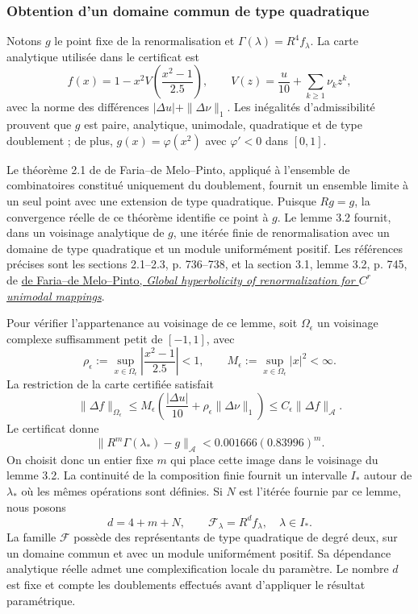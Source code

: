 \subsubsection{Obtention d’un domaine commun de type quadratique}
\label{hmtfg:clasificacion:8.1}

Notons \(g\) le point fixe de la renormalisation et
\(\Gamma(\lambda)=R^4f_\lambda\). La carte analytique utilisée dans le certificat est
\[
f(x)=1-x^2V\!\left(\frac{x^2-1}{2.5}\right),\qquad
V(z)=\frac{u}{10}+\sum_{k\ge1}\nu_kz^k,
\]
avec la norme des différences \(|\Delta u|+\|\Delta\nu\|_1\). Les inégalités d’admissibilité prouvent que \(g\) est paire, analytique, unimodale, quadratique et de type doublement ; de plus, \(g(x)=\varphi(x^2)\) avec \(\varphi'<0\) dans \([0,1]\).

Le théorème 2.1 de de Faria–de Melo–Pinto, appliqué à l’ensemble de combinatoires constitué uniquement du doublement, fournit un ensemble limite à un seul point avec une extension de type quadratique. Puisque \(Rg=g\), la convergence réelle de ce théorème identifie ce point à \(g\). Le lemme 3.2 fournit, dans un voisinage analytique de \(g\), une itérée finie de renormalisation avec un domaine de type quadratique et un module uniformément positif. Les références précises sont les sections 2.1–2.3, p. 736–738, et la section 3.1, lemme 3.2, p. 745, de \href{https://annals.math.princeton.edu/wp-content/uploads/annals-v164-n3-p01.pdf}{de Faria–de Melo–Pinto, \emph{Global hyperbolicity of renormalization for \(C^r\) unimodal mappings}}.

Pour vérifier l’appartenance au voisinage de ce lemme, soit \(\Omega_\epsilon\) un voisinage complexe suffisamment petit de \([-1,1]\), avec
\[
\rho_\epsilon:=\sup_{x\in\Omega_\epsilon}
\left|\frac{x^2-1}{2.5}\right|<1,
\qquad M_\epsilon:=\sup_{x\in\Omega_\epsilon}|x|^2<\infty.
\]
La restriction de la carte certifiée satisfait
\begin{equation}
\|\Delta f\|_{\Omega_\epsilon}
\le M_\epsilon\left(\frac{|\Delta u|}{10}
          +\rho_\epsilon\|\Delta\nu\|_1\right)
\le C_\epsilon\|\Delta f\|_{\mathcal A}.
\label{hmtfg:clasificacion:eq:16}
\end{equation}
Le certificat donne
\[
\|R^m\Gamma(\lambda_*)-g\|_{\mathcal A}
<0.001666(0.83996)^m.
\]
On choisit donc un entier fixe \(m\) qui place cette image dans le voisinage du lemme 3.2. La continuité de la composition finie fournit un intervalle \(I_*\) autour de \(\lambda_*\) où les mêmes opérations sont définies. Si \(N\) est l’itérée fournie par ce lemme, nous posons
\begin{equation}
d=4+m+N,\qquad
\mathcal F_\lambda=R^df_\lambda,\quad \lambda\in I_*.
\label{hmtfg:clasificacion:eq:17}
\end{equation}
La famille \(\mathcal F\) possède des représentants de type quadratique de degré deux, sur un domaine commun et avec un module uniformément positif. Sa dépendance analytique réelle admet une complexification locale du paramètre. Le nombre \(d\) est fixe et compte les doublements effectués avant d’appliquer le résultat paramétrique.

